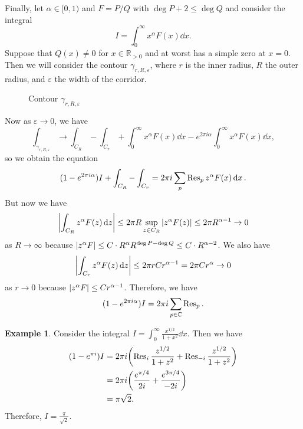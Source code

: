 \documentclass[leqno, openany]{memoir}
\theoremstyle{definition}
\newtheorem{exm}[thm]{Example}
\theoremstyle{remark}
\theoremstyle{plain}
\theoremstyle{definition}
\theoremstyle{remark}
\newcommand{\R}{\mathbb{R}}
\newcommand{\C}{\mathbb{C}}
\newcommand{\ep}{\varepsilon}
\begin{document}
Finally, let $\alpha \in [0,1)$ and $F = P/Q$ with $\deg P + 2 \leq \deg Q$ and consider the integral
\[ I = \int_0^{\infty} x^{\alpha} F(x) \dd{x}. \]
Suppose that $Q(x) \neq 0$ for $x \in \R_{>0}$ and at worst has a simple zero at $x = 0$. Then we will consider the contour $\gamma_{r,R, \ep}$, where $r$ is the inner radius, $R$ the outer radius, and $\ep$ the width of the corridor.
\begin{figure}[H]
\begin{center}
\end{center}
\caption{Contour $\gamma_{r,R,\ep}$}%
\label{fig:contour-3}
\end{figure}
Now as $\ep \to 0$, we have
\[ \int_{\gamma_{r,R,\ep}} \to \int_{C_R} - \int_{C_r} + \int_{0}^{\infty} x^{\alpha} F(x) \dd{x} - e^{2 \pi i \alpha} \int_0^{\infty} x^{\alpha} F(x) \dd{x}, \]
so we obtain the equation
\[ (1 - e^{2 \pi i \alpha})I + \int_{C_R} - \int_{C_r} = 2 \pi i \sum_p \Res_p z^{\alpha} F(x) \dd{x}. \]
But now we have
\[ \abs{\int_{C_R} z^{\alpha} F(z) \dd{z}} \leq 2 \pi R \sup_{z \in C_R} \abs{z^{\alpha} F(z)} \leq 2 \pi R^{\alpha - 1} \to 0 \]
as $R \to \infty$ because $\abs{z^{\alpha} F} \leq C \cdot R^{\alpha} R^{\deg P - \deg Q} \leq C \cdot R^{\alpha - 2}$. We also have
\[ \abs{\int_{C_r} z^{\alpha} F(z) \dd{z}} \leq 2 \pi r C r^{\alpha - 1} = 2 \pi C r^{\alpha} \to 0 \]
as $r \to 0$ because $\abs{z^{\alpha}F} \leq C r^{\alpha - 1}$. Therefore, we have
\[ (1 - e^{2 \pi i \alpha}) I = 2 \pi i \sum_{p \in \C} \Res_p. \]

\begin{exm}
    Consider the integral $I = \int_0^{\infty} \frac{x^{1/2}}{1 + x^2} \dd{x}$. Then we have
    \begin{align*}
        (1 - e^{\pi i}) I &= 2 \pi i \qty( \Res_i \frac{z^{1/2}}{1+z^2} + \Res_{-i} \frac{z^{1/2}}{1+z^2} ) \\
                          &= 2 \pi i \qty(\frac{e^{\pi/4}}{2i} + \frac{e^{3 \pi/4}}{-2i}) \\
                          &= \pi \sqrt{2}.
    \end{align*}
    Therefore, $I = \frac{\pi}{\sqrt{2}}$.
\end{exm}
\end{document}
